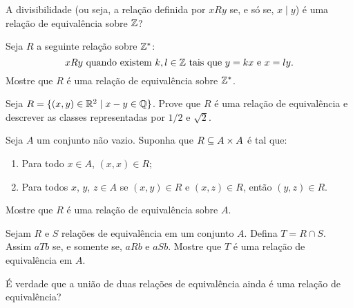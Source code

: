 \documentclass[12pt]{exam}
\begin{document}
    \vspace{.3cm}

    \questao{} A divisibilidade (ou seja, a rela{\c c}{\~a}o definida por $xRy$ se, e s{\'o}
    se, $x \mid y$) {\'e} uma rela{\c c}{\~a}o de equival{\^e}ncia sobre $\mathbb{Z}$?

    \vspace{.3cm}

    \questao{} Seja $R$ a seguinte rela{\c c}{\~a}o sobre $\mathbb{Z}^*$:
    \[
        x R y \mbox{ quando existem }  k, l \in \mathbb{Z} \mbox{ tais que } y = kx \mbox{ e } x = ly.
    \]
    Mostre que $R$ {\'e} uma rela{\c c}{\~a}o de equival{\^e}ncia sobre $\mathbb{Z}^*$.

    \vspace{.3cm}

    \questao{} Seja $R = \{ (x, y) \in \mathbb{R}^2 \mid x - y \in \mathbb{Q}\}$. Prove que $R$ {\'e} uma rela{\c c}{\~a}o de equival{\^e}ncia e descrever as classes representadas por $1/2$ e $\sqrt{2}$.

    \vspace{.3cm}

    \questao{} Seja $A$ um conjunto n\~ao vazio. Suponha que $R \subseteq A \times A$ \'e tal que:
    \begin{enumerate}[label={\alph*})]
        \item Para todo $x \in A$, $(x,x) \in R$;

        \item Para todos $x$, $y$, $z \in A$ se $(x, y) \in R$ e $(x,z) \in R$, ent\~ao $(y,z) \in R$.
    \end{enumerate}
    Mostre que $R$ \'e uma rela\c{c}\~ao de equival\^encia sobre $A$.

    \vspace{.3cm}

    \questao{} Sejam $R$ e $S$ relações de equivalência em um conjunto $A$. Defina $T = R \cap S$. Assim $aTb$ se, e somente se, $aRb$ e $aSb$. Mostre que $T$ é uma relação de equivalência em $A$.

    \vspace{.3cm}

    \questao{} É verdade que a união de duas relações de equivalência ainda é uma relação de equivalência?
\end{document}

